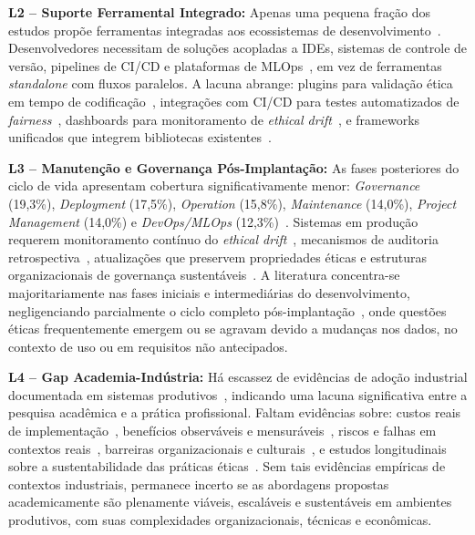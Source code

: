 \textbf{L2 -- Suporte Ferramental Integrado:} Apenas uma pequena fração dos estudos propõe ferramentas integradas aos ecossistemas de desenvolvimento~\cite{Hohman2020, Amershi2019}. Desenvolvedores necessitam de soluções acopladas a IDEs, sistemas de controle de versão, pipelines de CI/CD e plataformas de MLOps~\cite{Kreuzberger2023, Shankar2022}, em vez de ferramentas \textit{standalone} com fluxos paralelos. A lacuna abrange: plugins para validação ética em tempo de codificação~\cite{Holstein2019, Weisz2021}, integrações com CI/CD para testes automatizados de \textit{fairness}~\cite{Breck2017, Galhotra2017}, dashboards para monitoramento de \textit{ethical drift}~\cite{Paleyes2022}, e frameworks unificados que integrem bibliotecas existentes~\cite{Bellamy2019, Bird2020}.

\textbf{L3 -- Manutenção e Governança Pós-Implantação:} As fases posteriores do ciclo de vida apresentam cobertura significativamente menor: \textit{Governance} (19,3\%), \textit{Deployment} (17,5\%), \textit{Operation} (15,8\%), \textit{Maintenance} (14,0\%), \textit{Project Management} (14,0\%) e \textit{DevOps/MLOps} (12,3\%)~\cite{Paleyes2022}. Sistemas em produção requerem monitoramento contínuo do \textit{ethical drift}~\cite{Klaise2020}, mecanismos de auditoria retrospectiva~\cite{Raji2019, Mitchell2019}, atualizações que preservem propriedades éticas e estruturas organizacionais de governança sustentáveis~\cite{Metcalf2021, Raji2020}. A literatura concentra-se majoritariamente nas fases iniciais e intermediárias do desenvolvimento, negligenciando parcialmente o ciclo completo pós-implantação~\cite{Lwakatare2019, Polyzotis2017}, onde questões éticas frequentemente emergem ou se agravam devido a mudanças nos dados, no contexto de uso ou em requisitos não antecipados.

\textbf{L4 -- Gap Academia-Indústria:} Há escassez de evidências de adoção industrial documentada em sistemas produtivos~\cite{Rakova2021, Holstein2019, Madaio2020}, indicando uma lacuna significativa entre a pesquisa acadêmica e a prática profissional. Faltam evidências sobre: custos reais de implementação~\cite{Sculley2015}, benefícios observáveis e mensuráveis~\cite{Amershi2019}, riscos e falhas em contextos reais~\cite{Piorkowski2021}, barreiras organizacionais e culturais~\cite{Metcalf2021, Moss2021}, e estudos longitudinais sobre a sustentabilidade das práticas éticas~\cite{Lwakatare2019}. Sem tais evidências empíricas de contextos industriais, permanece incerto se as abordagens propostas academicamente são plenamente viáveis, escaláveis e sustentáveis em ambientes produtivos, com suas complexidades organizacionais, técnicas e econômicas.

